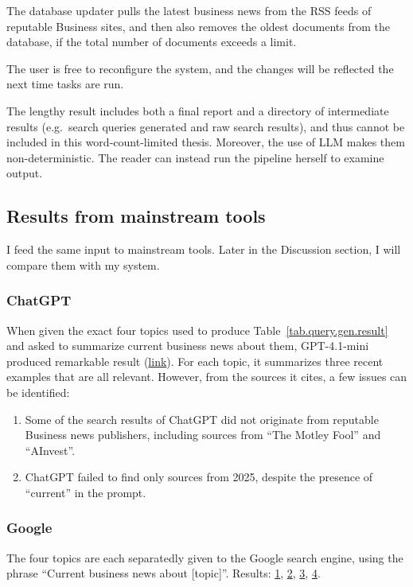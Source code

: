 \documentclass[final-report]{report-template}
\begin{document}
The database updater pulls the latest business news from the RSS feeds of
reputable Business sites, and then also removes the oldest documents from the
database, if the total number of documents exceeds a limit.

The user is free to reconfigure the system, and the changes will be reflected
the next time tasks are run.

The lengthy result includes both a final report and a directory of intermediate
results (e.g.\ search queries generated and raw search results), and thus
cannot be included in this word-count-limited thesis. Moreover, the use of LLM
makes them non-deterministic. The reader can instead run the pipeline herself
to examine output.

\subsection{Results from mainstream tools}
I feed the same input to mainstream tools. Later in the Discussion section, I
will compare them with my system.

\subsubsection{ChatGPT}
When given the exact four topics used to produce
Table~\ref{tab.query.gen.result} and asked to summarize current business news
about them, GPT-4.1-mini produced remarkable result
(\href{https://chatgpt.com/share/689a428d-f01c-8011-a115-57b4ca19a278}{link}).
For each topic, it summarizes three recent examples that are all relevant.
However, from the sources it cites, a few issues can be identified:
\begin{enumerate}
	\item Some of the search results of ChatGPT did not originate from
		reputable Business news publishers, including sources from ``The Motley
		Fool'' and ``AInvest''.
	\item ChatGPT failed to find only sources from 2025, despite the presence of
		``current'' in the prompt.
\end{enumerate}

\subsubsection{Google}
The four topics are each separatedly given to the Google search engine, using
the phrase ``Current business news about [topic]''. Results: 
\href{https://www.google.com/search?q=Current+business+news+about+vertical+integration}{1}, 
\href{https://www.google.com/search?q=Current+business+news+about+diversification+strategies}{2}, 
\href{https://www.google.com/search?q=Current+business+news+about+competitive+advantage}{3}, 
\href{https://www.google.com/search?q=Current+business+news+about+foreign+direct+investment}{4}.
\end{document}
